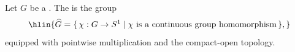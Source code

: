 \begin{definition} \label{definition:pontryagin_dual_of_a_locally_compact_abelian_group}
    Let \( G \) be a . 
    The  is the group
    $$\hlin{\widehat{G} = \{\, \chi : G \to S^1 \mid \chi \text{ is a continuous group homomorphism} \,\},}$$
    equipped with pointwise multiplication and the compact-open topology.
\end{definition}